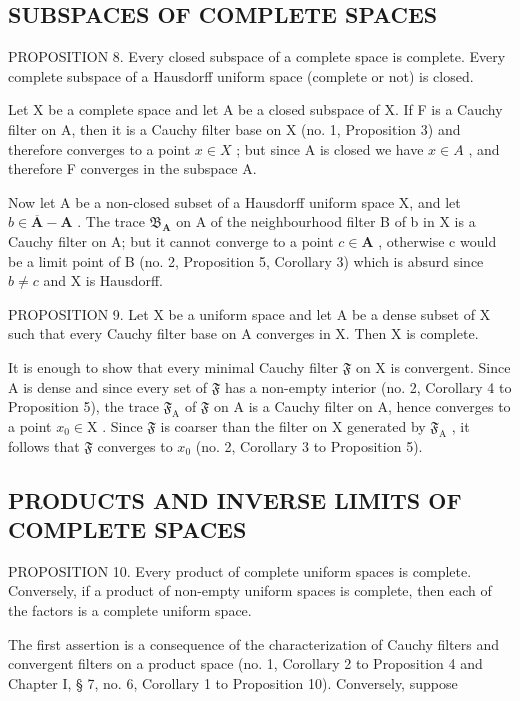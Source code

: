\subsection{SUBSPACES OF COMPLETE SPACES}

PROPOSITION 8. Every closed subspace of a complete space is complete. Every complete subspace of a Hausdorff uniform space (complete or not) is closed.

Let X be a complete space and let A be a closed subspace of X. If F is a Cauchy filter on A, then it is a Cauchy filter base on X (no. 1, Proposition 3) and therefore converges to a point \(x \in X\) ; but since A is closed we have \(x \in A\) , and therefore F converges in the subspace A.

Now let A be a non-closed subset of a Hausdorff uniform space X, and let \(b \in \overline{\mathbf{A}} - \mathbf{A}\) . The trace \(\mathfrak{B}_{\mathbf{A}}\) on A of the neighbourhood filter B of b in X is a Cauchy filter on A; but it cannot converge to a point \(c \in \mathbf{A}\) , otherwise c would be a limit point of B (no. 2, Proposition 5, Corollary 3) which is absurd since \(b \neq c\) and X is Hausdorff.

PROPOSITION 9. Let X be a uniform space and let A be a dense subset of X such that every Cauchy filter base on A converges in X. Then X is complete.

It is enough to show that every minimal Cauchy filter \(\mathfrak{F}\) on X is convergent. Since A is dense and since every set of \(\mathfrak{F}\) has a non-empty interior (no. 2, Corollary 4 to Proposition 5), the trace \(\mathfrak{F}_{\mathrm{A}}\) of \(\mathfrak{F}\) on A is a Cauchy filter on A, hence converges to a point \(x_{0} \in \mathrm{X}\) . Since \(\mathfrak{F}\) is coarser than the filter on X generated by \(\mathfrak{F}_{\mathrm{A}}\) , it follows that \(\mathfrak{F}\) converges to \(x_{0}\) (no. 2, Corollary 3 to Proposition 5).

\subsection{PRODUCTS AND INVERSE LIMITS OF COMPLETE SPACES}

PROPOSITION 10. Every product of complete uniform spaces is complete. Conversely, if a product of non-empty uniform spaces is complete, then each of the factors is a complete uniform space.

The first assertion is a consequence of the characterization of Cauchy filters and convergent filters on a product space (no. 1, Corollary 2 to Proposition 4 and Chapter I, § 7, no. 6, Corollary 1 to Proposition 10). Conversely, suppose

